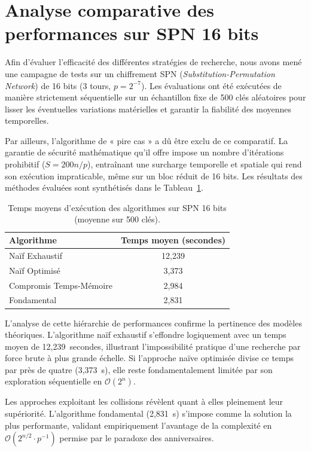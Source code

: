 \documentclass[a4paper,11pt]{article}
\begin{document}
\section{Analyse comparative des performances sur SPN 16 bits}

Afin d'évaluer l'efficacité des différentes stratégies de recherche, nous avons mené une campagne de tests sur un chiffrement SPN (\textit{Substitution-Permutation Network}) \cite{Heys02} de 16 bits (3 tours, $p=2^{-7}$). Les évaluations ont été exécutées de manière strictement séquentielle sur un échantillon fixe de 500 clés aléatoires pour lisser les éventuelles variations matérielles et garantir la fiabilité des moyennes temporelles.

Par ailleurs, l'algorithme de « pire cas » a dû être exclu de ce comparatif. La garantie de sécurité mathématique qu'il offre impose un nombre d'itérations prohibitif ($S = 200n/p$), entraînant une surcharge temporelle et spatiale qui rend son exécution impraticable, même sur un bloc réduit de 16 bits. Les résultats des méthodes évaluées sont synthétisés dans le Tableau~\ref{tab:perf_spn16}.

\begin{table}[htbp]
    \centering
    \caption{Temps moyens d'exécution des algorithmes sur SPN 16 bits (moyenne sur 500 clés).}
    \label{tab:perf_spn16}
    \begin{tabular}{lc}
        \toprule
        \textbf{Algorithme} & \textbf{Temps moyen (secondes)} \\
        \midrule
        Naïf Exhaustif & 12,239 \\
        Naïf Optimisé & 3,373 \\
        Compromis Temps-Mémoire & 2,984 \\
        Fondamental & 2,831 \\
        \bottomrule
    \end{tabular}
\end{table}

L'analyse de cette hiérarchie de performances confirme la pertinence des modèles théoriques. L'algorithme naïf exhaustif s'effondre logiquement avec un temps moyen de 12,239~secondes, illustrant l'impossibilité pratique d'une recherche par force brute à plus grande échelle. Si l'approche naïve optimisée divise ce temps par près de quatre (3,373~s), elle reste fondamentalement limitée par son exploration séquentielle en $\mathcal{O}(2^n)$.

Les approches exploitant les collisions révèlent quant à elles pleinement leur supériorité. L'algorithme fondamental (2,831~s) s'impose comme la solution la plus performante, validant empiriquement l'avantage de la complexité en $\mathcal{O}(2^{n/2} \cdot p^{-1})$ permise par le paradoxe des anniversaires. 
\end{document}
